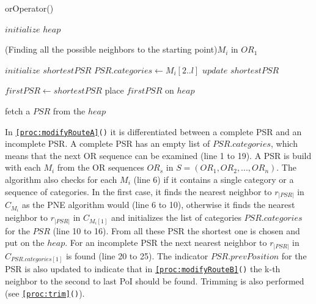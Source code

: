 \begin{algorithm}[H]
\caption{orOperator()}
\label{alg:or}
	
	
	\BlankLine
	
	$initialize$ $heap$\; 
	
	\ForEach(Finding all the possible neighbors to the starting point){$M_i$ in $OR_1$}{
		$initialize$ $shortestPSR$\;
		{
			\;
			$PSR.categories \leftarrow M_i[2..l]$\;
			$update$ $shortestPSR$\;
		}	
		
	}
	$firstPSR \leftarrow shortestPSR$\;
	place $firstPSR$ on $heap$\;
	
	\BlankLine
	
	
	fetch a $PSR$ from the $heap$\;

\end{algorithm}

In \texttt{\ref{proc:modifyRouteA}()} it is differentiated between a complete PSR and an incomplete PSR. 
A complete PSR has an empty list of $PSR.categories$, which means that the next OR sequence can be examined (line 1 to 19). A PSR is build with each $M_i$ from the OR sequences $OR_s$ in $S = (OR_1, OR_2, ..., OR_n)$. The algorithm also checks for each $M_i$ (line 6) if it contains a single category or a sequence of categories. In the first case, it finds the nearest neighbor to $r_{|PSR|}$ in $C_{M_{i}}$ as the PNE algorithm would (line 6 to 10), otherwise it finds the nearest neighbor to $r_{|PSR|}$ in $C_{M_i[1]}$ and initializes the list of categories $PSR.categories$ for the $PSR$ (line 10 to 16). From all these PSR the shortest one is chosen and put on the $heap$.
For an incomplete PSR the next nearest neighbor to $r_{|PSR|}$ in $C_{PSR.categories[1]}$ is found (line 20 to 25). The indicator $PSR.prevPosition$ for the PSR is also updated to indicate that in \texttt{\ref{proc:modifyRouteB}()} the k-th neighbor to the second to last PoI should be found.
Trimming is also performed (see \texttt{\ref{proc:trim}()}). \newline

